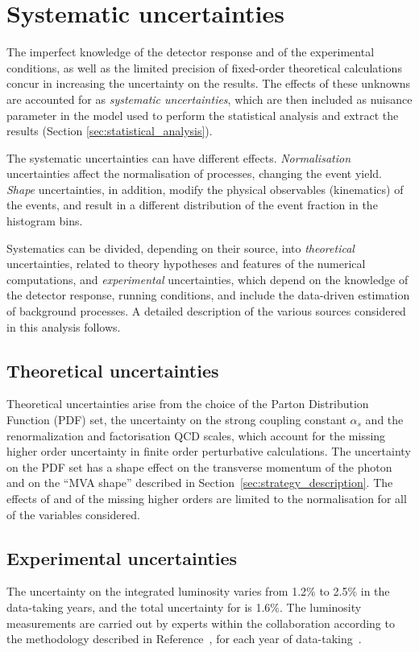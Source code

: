 \section{Systematic uncertainties}
\label{sec:systematics}
The imperfect knowledge of the detector response and of the experimental conditions, as well as the limited precision of fixed-order theoretical calculations concur in increasing the uncertainty on the results.
The effects of these unknowns are accounted for as \textit{systematic uncertainties}, which are then included as nuisance parameter in the model used to perform the statistical analysis and extract the results (Section \ref{sec:statistical_analysis}).

The systematic uncertainties can have different effects.
\textit{Normalisation} uncertainties affect the normalisation of processes, changing the event yield.
\textit{Shape} uncertainties, in addition, modify the physical observables (\eg kinematics) of the events, and result in a different distribution of the event fraction in the histogram bins.

Systematics can be divided, depending on their source, into \textit{theoretical} uncertainties, related to theory hypotheses and features of the numerical computations, and \textit{experimental} uncertainties, which depend on the knowledge of the detector response, running conditions, and include the data-driven estimation of background processes.
A detailed description of the various sources considered in this analysis follows.

\subsection{Theoretical uncertainties}
Theoretical uncertainties arise from the choice of the Parton Distribution Function (PDF) set,
the uncertainty on the strong coupling constant $\alpha_s$ and
the renormalization and factorisation QCD scales, which account for the missing higher order uncertainty in finite order perturbative calculations.
The uncertainty on the PDF set has a shape effect on the transverse momentum of the photon
and on the ``MVA shape'' described in Section~\ref{sec:strategy_description}.
The effects of \alpS and of the missing higher orders are limited to the normalisation for all of the variables considered.

\subsection{Experimental uncertainties}
The uncertainty on the integrated luminosity varies from 1.2\usep\% to 2.5\usep\% in the data-taking years, and the total uncertainty for \RunII{} is 1.6\usep\%.
The luminosity measurements are carried out by experts within the collaboration according to the methodology described in Reference~\cite{CMS-LUM-17-003},
for each year of data-taking~\cite{CMS-LUM-17-004, CMS-LUM-18-002}.

